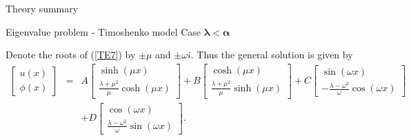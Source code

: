 \documentclass{beamer}
\begin{document}
\begin{frame}{Theory summary}
    
\end{frame}

\begin{frame}{Eigenvalue problem - Timoshenko model}
    Case $\boldsymbol{\lambda<\alpha}$

    Denote the roots of (\ref{TE7}) by $\pm \mu$ and $\pm \omega i$. Thus the general solution is given by
    \begin{eqnarray*}
    \begin{bmatrix}
    u(x)\\ \phi(x)
    \end{bmatrix}
    &=&
    A
    \begin{bmatrix}
    \sinh (\mu x) \\ \frac{\lambda+\mu^{2}}{\mu}\cosh (\mu x)
    \end{bmatrix}
    +
    B
    \begin{bmatrix}
    \cosh (\mu x) \\ \frac{\lambda+\mu^{2}}{\mu}\sinh (\mu x)
    \end{bmatrix}
    +
    C
    \begin{bmatrix}
    \sin (\omega x) \\ -\frac{\lambda-\omega^{2}}{\omega}\cos (\omega x)
    \end{bmatrix}\\
    &&
    +
    D
    \begin{bmatrix}
    \cos (\omega x) \\ \frac{\lambda-\omega^{2}}{\omega}\sin (\omega x)
    \end{bmatrix}.
    \end{eqnarray*}
\end{frame}
\end{document}
